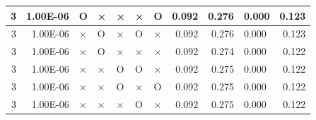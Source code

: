 \documentclass[11pt]{article}
\begin{document}
\begin{longtable}[h]{|r|r|l|l|l|l|l|r|r|l|r|}
3                                 & 1.00E-06                         & O                                & ×                                & ×                                & ×                                & O                                 & 0.092                             & 0.276                             & 0.000                              & 0.123                               \\ \hline
3                                 & 1.00E-06                         & ×                                & O                                & ×                                & O                                & ×                                 & 0.092                             & 0.276                             & 0.000                              & 0.123                               \\ \hline
3                                 & 1.00E-06                         & ×                                & O                                & ×                                & ×                                & ×                                 & 0.092                             & 0.274                             & 0.000                              & 0.122                               \\ \hline
3                                 & 1.00E-06                         & ×                                & ×                                & O                                & O                                & ×                                 & 0.092                             & 0.275                             & 0.000                              & 0.122                               \\ \hline
3                                 & 1.00E-06                         & ×                                & ×                                & O                                & ×                                & O                                 & 0.092                             & 0.275                             & 0.000                              & 0.122                               \\ \hline
3                                 & 1.00E-06                         & ×                                & ×                                & ×                                & O                                & ×                                 & 0.092                             & 0.275                             & 0.000                              & 0.122                               \\ \hline

\end{longtable}
\end{document}

